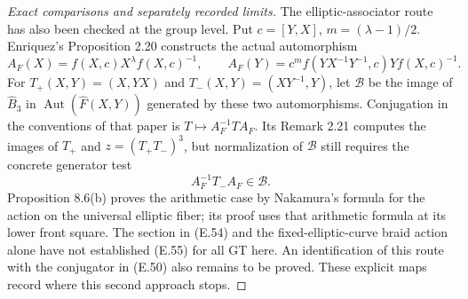 \begin{proof}[Exact comparisons and separately recorded limits]
The elliptic-associator route has also been checked
at the group level.  Put $c=[Y,X]$, $m=(\lambda-1)/2$.
Enriquez's Proposition 2.20 \cite{ET_Enriquez2014}
constructs the actual automorphism
\[
 A_F(X)=f(X,c)X^\lambda f(X,c)^{-1},\qquad
 A_F(Y)=c^m f(YX^{-1}Y^{-1},c)Y f(X,c)^{-1}.
                                                               \tag{E.54}
\]
For $T_+(X,Y)=(X,YX)$ and
$T_-(X,Y)=(XY^{-1},Y)$, let $\mathcal B$ be the
image of $\widehat B_3$ in
$\operatorname{Aut}(\widehat F(X,Y))$ generated by
these two automorphisms.  Conjugation in the conventions
of that paper is $T\mapsto A_F^{-1}TA_F$.
Its Remark 2.21 computes the images of $T_+$ and
$z=(T_+T_-)^3$, but normalization of $\mathcal B$
still requires the concrete generator test
\[
                   A_F^{-1}T_-A_F\in\mathcal B.             \tag{E.55}
\]
Proposition 8.6(b) proves the arithmetic case by
Nakamura's formula for the action on the universal
elliptic fiber; its proof uses that arithmetic
formula at its lower front square.  The section in
(E.54) and the fixed-elliptic-curve braid action alone
have not established (E.55) for all GT here.  An
identification of this route with the conjugator in
(E.50) also remains to be proved.  These explicit
maps record where this second approach stops.
\end{proof}

